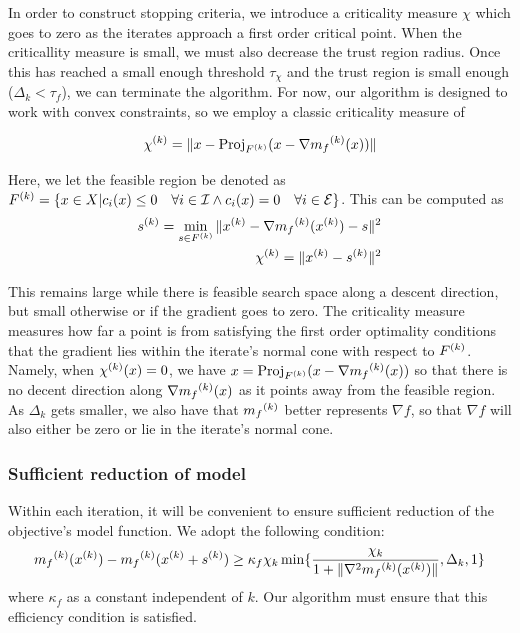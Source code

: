In order to construct stopping criteria, we introduce a criticality measure $\chi$ which goes to zero as the iterates approach a first order critical point.
When the criticallity measure is small, we must also decrease the trust region radius.
Once this has reached a small enough threshold $\tau_{\chi}$ and the trust region is small enough ($\Delta_k < \tau_f$), we can terminate the algorithm.
For now, our algorithm is designed to work with convex constraints, so we employ a classic criticality measure of

\[
{\chi^{(k)}} = \|x - \text{Proj}_{{F}^{(k)}}(x - \nabla {{m}_f}^{(k)}(x))\|
\]

Here, we let the feasible region be denoted as ${F}^{(k)} = \{x \in X | c_i(x) \le 0 \quad \forall i \in \mathcal I \wedge c_i(x) = 0 \quad \forall i \in \mathcal E \}$.
This can be computed as 
\begin{align}
\label{critical}
{s}^{(k)} = \min_{s \in {F}^{(k)}} \|{x}^{(k)} - \nabla {{m}_f}^{(k)}({x}^{(k)}) - s\|^2 \\
{\chi^{(k)}} = \|{x}^{(k)} - {s}^{(k)} \|^2 \\
\end{align}

This remains large while there is feasible search space along a descent direction, but small otherwise or if the gradient goes to zero.
The criticality measure measures how far a point is from satisfying the first order optimality conditions that the gradient lies within the iterate's normal cone with respect to ${F}^{(k)}$.
Namely, when $ {\chi^{(k)}}(x) = 0$, we have $x = \text{Proj}_{{F}^{(k)}}(x - \nabla {{m}_f}^{(k)}(x))$ so that there is no decent direction along $\nabla {{m}_f}^{(k)}(x)$ as it points away from the feasible region.
As $\Delta_k$ gets smaller, we also have that ${{m}_f}^{(k)}$ better represents $\nabla f$, so that $\nabla f$ will also either be zero or lie in the iterate's normal cone.

\subsubsection{Sufficient reduction of model}

Within each iteration, it will be convenient to ensure sufficient reduction of the objective's model function.
We adopt the following condition:
\begin{equation}
\label{efficiency}
{{m}_f}^{(k)}({x}^{(k)}) - {{m}_f}^{(k)}({x}^{(k)} + {s}^{(k)}) \ge \kappa_f \chi_k \min\{ \frac{\chi_k}{1+\|\nabla^2 {{m}_f}^{(k)}({x}^{(k)})\|}, \Delta_k, 1 \}
\end{equation}
where $\kappa_f$ as a constant independent of $k$.
Our algorithm must ensure that this efficiency condition is satisfied.

